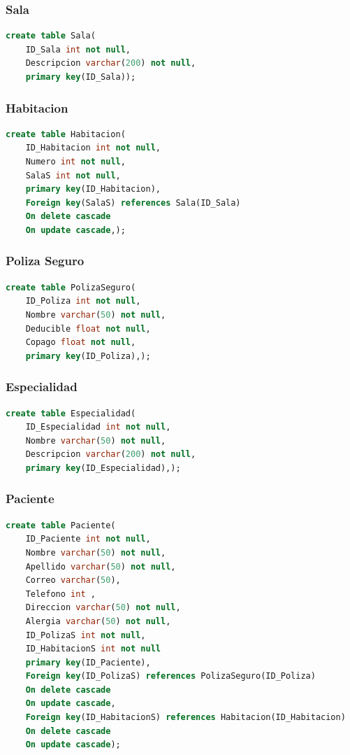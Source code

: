 \documentclass[10pt,letterpaper]{book}
\begin{document}
\subsubsection{Sala}
\begin{lstlisting}[language=sql]
create table Sala(
	ID_Sala int not null,
	Descripcion varchar(200) not null,
	primary key(ID_Sala));
\end{lstlisting}
\subsubsection{Habitacion}
\begin{lstlisting}[language=sql]
create table Habitacion(
	ID_Habitacion int not null,
	Numero int not null,
	SalaS int not null,
	primary key(ID_Habitacion),
	Foreign key(SalaS) references Sala(ID_Sala)
	On delete cascade
	On update cascade,);
\end{lstlisting}
\subsubsection{Poliza Seguro}
\begin{lstlisting}[language=sql]
create table PolizaSeguro(
	ID_Poliza int not null,
	Nombre varchar(50) not null,
	Deducible float not null,
	Copago float not null,
	primary key(ID_Poliza),);
\end{lstlisting}
\subsubsection{Especialidad}
\begin{lstlisting}[language=sql]
create table Especialidad(
	ID_Especialidad int not null,
	Nombre varchar(50) not null,
	Descripcion varchar(200) not null,
	primary key(ID_Especialidad),);
\end{lstlisting}
\subsubsection{Paciente}
\begin{lstlisting}[language=sql]
create table Paciente(
	ID_Paciente int not null,
	Nombre varchar(50) not null,
	Apellido varchar(50) not null,
	Correo varchar(50),
	Telefono int ,
	Direccion varchar(50) not null,
	Alergia varchar(50) not null,
	ID_PolizaS int not null,
	ID_HabitacionS int not null
	primary key(ID_Paciente),
	Foreign key(ID_PolizaS) references PolizaSeguro(ID_Poliza)
	On delete cascade
	On update cascade,
	Foreign key(ID_HabitacionS) references Habitacion(ID_Habitacion)
	On delete cascade
	On update cascade);
\end{lstlisting}
\end{document}
